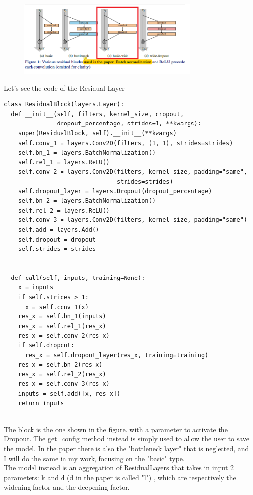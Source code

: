 \begin{figure}[h!]
\centering
\includegraphics[width=0.8\textwidth]{wresnet.png}
\end{figure}

Let's see the code of the Residual Layer
\lstset{language=Python}
\lstset{frame=lines}
\lstset{basicstyle=\footnotesize}
\begin{lstlisting}
class ResidualBlock(layers.Layer):
  def __init__(self, filters, kernel_size, dropout,
               dropout_percentage, strides=1, **kwargs):
    super(ResidualBlock, self).__init__(**kwargs)
    self.conv_1 = layers.Conv2D(filters, (1, 1), strides=strides)
    self.bn_1 = layers.BatchNormalization()
    self.rel_1 = layers.ReLU()
    self.conv_2 = layers.Conv2D(filters, kernel_size, padding="same",
                                strides=strides)
    self.dropout_layer = layers.Dropout(dropout_percentage)
    self.bn_2 = layers.BatchNormalization()
    self.rel_2 = layers.ReLU()
    self.conv_3 = layers.Conv2D(filters, kernel_size, padding="same")
    self.add = layers.Add()
    self.dropout = dropout
    self.strides = strides


  def call(self, inputs, training=None):
    x = inputs
    if self.strides > 1:
      x = self.conv_1(x)
    res_x = self.bn_1(inputs)
    res_x = self.rel_1(res_x)
    res_x = self.conv_2(res_x)
    if self.dropout:
      res_x = self.dropout_layer(res_x, training=training)
    res_x = self.bn_2(res_x)
    res_x = self.rel_2(res_x)
    res_x = self.conv_3(res_x)
    inputs = self.add([x, res_x])
    return inputs
 
\end{lstlisting}
The block is the one shown in the figure, with a parameter to activate the Dropout. The get\_config method instead is simply used to allow the user to save the model.
In the paper there is also the "bottleneck layer" that is neglected, and I will do the same in my work, focusing on the "basic" type.\\
The model instead is an aggregation of ResidualLayers that takes in input 2 parameters: k and d (d in the paper is called "l") , which are respectively the widening factor and the deepening factor.\\
